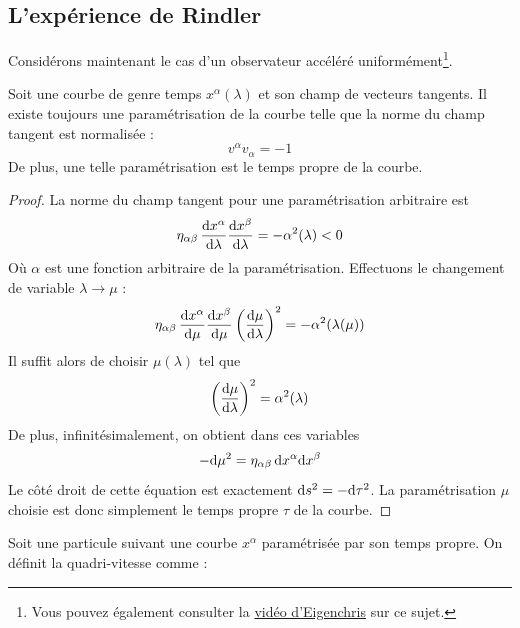 {\subsection{L'expérience de Rindler}
Considérons maintenant le cas d'un observateur accéléré uniformément\footnote{Vous pouvez également consulter la \href{https://youtu.be/yyzPCtmll58?si=rmU0qF_0cyaDOqnC}{vidéo d'Eigenchris} sur ce sujet.}. 
\begin{theoremframe}
    \begin{propri}
        Soit une courbe de genre temps $x^\alpha(\lambda)$ et son champ de vecteurs tangents. Il existe toujours une paramétrisation de la courbe telle que la norme du champ tangent est normalisée : 
        \begin{equation}
            v^\alpha v_\alpha = -1
        \end{equation}
        De plus, une telle paramétrisation est le temps propre de la courbe.
    \end{propri}
\end{theoremframe}
\begin{proof}
    La norme du champ tangent pour une paramétrisation arbitraire est
    \begin{equation}
        \eta_{\alpha\beta} \, \frac{\mathrm{d} x^\alpha}{\mathrm{d} \lambda} \frac{\mathrm{d} x^\beta}{\mathrm{d} \lambda} = - \alpha^2(\lambda) < 0
    \end{equation}
    Où $\alpha$ est une fonction arbitraire de la paramétrisation. Effectuons le changement de variable $\lambda \to \mu $ :
    \begin{equation}
        \eta_{\alpha\beta} \, \frac{\mathrm{d} x^\alpha}{\mathrm{d} \mu} \frac{\mathrm{d} x^\beta}{\mathrm{d} \mu} \left( \frac{\mathrm{d} \mu}{\mathrm{d} \lambda} \right)^2 = - \alpha^2 (\lambda (\mu))
    \end{equation}
    Il suffit alors de choisir $\mu(\lambda)$ tel que
    \begin{equation}
        \left( \frac{\mathrm{d} \mu}{\mathrm{d} \lambda} \right)^2 = \alpha^2 (\lambda)
    \end{equation}
    De plus, infinitésimalement, on obtient dans ces variables
    \begin{equation}
        - \mathrm{d} \mu ^2 = \eta_{\alpha\beta} \, \mathrm{d} x^\alpha \mathrm{d} x^\beta
    \end{equation}
    Le côté droit de cette équation est exactement $\mathrm{d} s^2 = - \mathrm{d} \tau^2$. La paramétrisation $\mu$ choisie est donc simplement le temps propre $\tau$ de la courbe.
\end{proof}
Soit une particule suivant une courbe $x^\alpha$ paramétrisée par son temps propre. On définit la quadri-vitesse comme :
}
